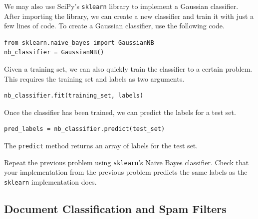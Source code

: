We may also use SciPy's {\tt sklearn} library to implement a Gaussian classifier.
After importing the library, we can create a new classifier and train it with just a few lines of code.
To create a Gaussian classifier, use the following code.

\begin{lstlisting}
from sklearn.naive_bayes import GaussianNB
nb_classifier = GaussianNB()
\end{lstlisting}

Given a training set, we can also quickly train the classifier to a certain problem.
This requires the training set and labels as two arguments.

\begin{lstlisting}
nb_classifier.fit(training_set, labels)
\end{lstlisting}

Once the classifier has been trained, we can predict the labels for a test set.

\begin{lstlisting}
pred_labels = nb_classifier.predict(test_set)
\end{lstlisting}

The {\tt predict} method returns an array of labels for the test set.

\begin{problem}

Repeat the previous problem using {\tt sklearn}'s Naive Bayes classifier.
Check that your implementation from the previous problem predicts the same labels as the {\tt sklearn}
implementation does.

\end{problem}


\subsection*{Document Classification and Spam Filters}

